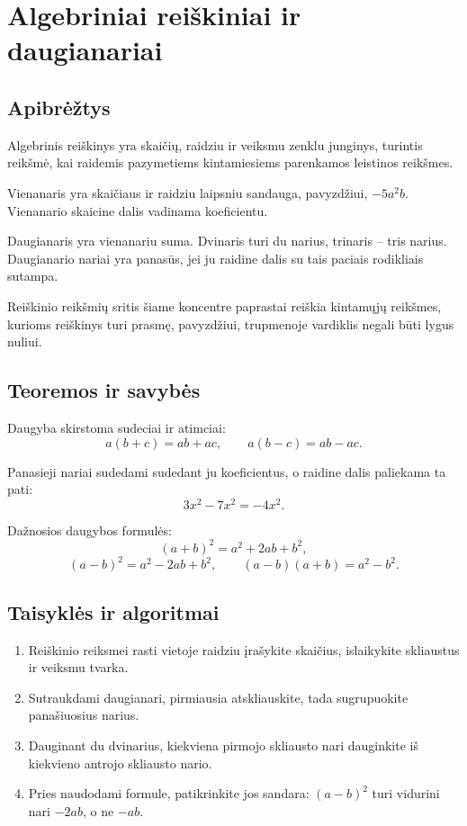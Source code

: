 \section{Algebriniai reiškiniai ir daugianariai}\label{sec:algebriniai-reiskiniai-ir-daugianariai}

\subsection{Apibrėžtys}
\begin{apibreztis}
Algebrinis reiškinys yra skaičių, raidziu ir veiksmu zenklu junginys, turintis reikšmė, kai raidemis pazymetiems kintamiesiems parenkamos leistinos reikšmes.
\end{apibreztis}
\begin{apibreztis}
Vienanaris yra skaičiaus ir raidziu laipsniu sandauga, pavyzdžiui, $-5a^2b$. Vienanario skaicine dalis vadinama koeficientu.
\end{apibreztis}
\begin{apibreztis}
Daugianaris yra vienanariu suma. Dvinaris turi du narius, trinaris -- tris narius. Daugianario nariai yra panasūs, jei ju raidine dalis su tais paciais rodikliais sutampa.
\end{apibreztis}
\begin{apibreztis}
Reiškinio reikšmių sritis šiame koncentre paprastai reiškia kintamųjų reikšmes, kurioms reiškinys turi prasmę, pavyzdžiui, trupmenoje vardiklis negali būti lygus nuliui.
\end{apibreztis}

\subsection{Teoremos ir savybės}
\begin{savybe}
Daugyba skirstoma sudeciai ir atimciai:
\[
a(b+c)=ab+ac,\qquad a(b-c)=ab-ac.
\]
\end{savybe}
\begin{savybe}
Panasieji nariai sudedami sudedant ju koeficientus, o raidine dalis paliekama ta pati:
\[
3x^2-7x^2=-4x^2.
\]
\end{savybe}
\begin{savybe}
Dažnosios daugybos formulės:
\[
(a+b)^2=a^2+2ab+b^2,
\]
\[
(a-b)^2=a^2-2ab+b^2,\qquad (a-b)(a+b)=a^2-b^2.
\]
\end{savybe}

\subsection{Taisyklės ir algoritmai}
\begin{enumerate}[label=\arabic*.]
\item Reiškinio reiksmei rasti vietoje raidziu įrašykite skaičius, islaikykite skliaustus ir veiksmu tvarka.
\item Sutraukdami daugianari, pirmiausia atskliauskite, tada sugrupuokite panašiuosius narius.
\item Dauginant du dvinarius, kiekviena pirmojo skliausto nari dauginkite iš kiekvieno antrojo skliausto nario.
\item Pries naudodami formule, patikrinkite jos sandara: $(a-b)^2$ turi vidurini nari $-2ab$, o ne $-ab$.
\end{enumerate}
